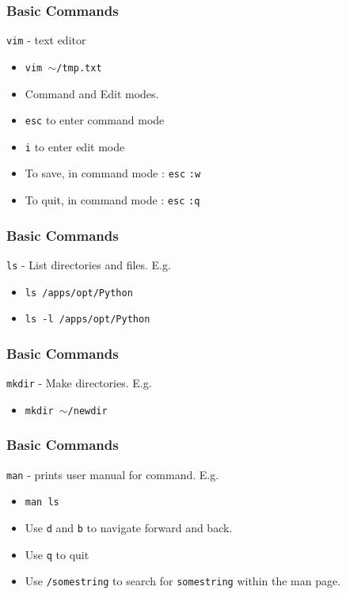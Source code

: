 \documentclass{beamer}
\newcommand{\code}[1]{\colorbox{codegray}{\texttt{#1}}}
\begin{document}
\begin{frame}
\frametitle{Basic Commands}
\code{vim} - text editor
\bigskip
\begin{itemize}
    \item \code{vim $\sim$/tmp.txt}
    \bigskip
    \pause
    \item Command and Edit modes.
    \bigskip
    \pause
    \item \code{esc} to enter command mode
    \pause
    \bigskip
    \item \code{i} to enter edit mode
    \pause
    \bigskip
    \item To save, in command mode : \code{esc} \code{:w}
    \pause
    \bigskip
    \item To quit, in command mode : \code{esc} \code{:q}
\end{itemize}
\end{frame}


\begin{frame}
\frametitle{Basic Commands}
\code{ls} - List directories and files. E.g.
\bigskip
\begin{itemize}
    \item \code{ls /apps/opt/Python}
    \bigskip
    \pause
    \item \code{ls -l /apps/opt/Python} 
\end{itemize}
\end{frame}



\begin{frame}
\frametitle{Basic Commands}
\code{mkdir} - Make directories. E.g.
\bigskip
\begin{itemize}
    \item \code{mkdir $\sim$/newdir}
\end{itemize}
\end{frame}


\begin{frame}
\frametitle{Basic Commands}
\code{man} - prints user manual for command. E.g.
\bigskip
\begin{itemize}
    \item \code{man ls}
    \pause
    \bigskip
    \item Use \code{d} and \code{b} to navigate forward and back.
    \pause
    \bigskip
    \item Use \code{q} to quit
    \pause
    \bigskip
    \item Use \code{/somestring} to search for \code{somestring} within the man page.
\end{itemize}
\end{frame}
\end{document}
